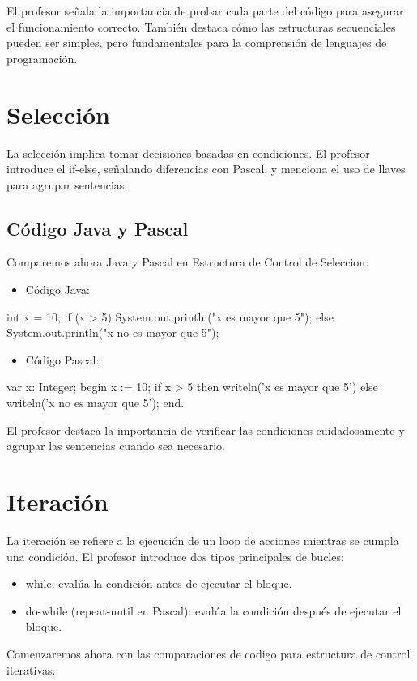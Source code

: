 \documentclass[a4paper]{report}
\begin{document}
El profesor señala la importancia de probar cada parte del código para asegurar el funcionamiento correcto. También destaca cómo las estructuras secuenciales pueden ser simples, pero fundamentales para la comprensión de lenguajes de programación.



\section{Selección}
La selección implica tomar decisiones basadas en condiciones. El profesor introduce el if-else, señalando diferencias con Pascal, y menciona el uso de llaves para agrupar sentencias.

\subsection{Código Java y Pascal}
Comparemos ahora Java y Pascal en Estructura de Control de Seleccion:

\begin{itemize}
    \item Código Java:
\end{itemize}
\begin{roundedlst}
int x = 10;
if (x > 5) {
    System.out.println("x es mayor que 5");
} else {
    System.out.println("x no es mayor que 5");
}
\end{roundedlst}

\begin{itemize}
    \item Código Pascal:
\end{itemize}
\begin{roundedlst}
var
  x: Integer;
begin
  x := 10;
  if x > 5 then
    writeln('x es mayor que 5')
  else
    writeln('x no es mayor que 5');
end.
\end{roundedlst}

El profesor destaca la importancia de verificar las condiciones cuidadosamente y agrupar las sentencias cuando sea necesario.

\section{Iteración}

La iteración se refiere a la ejecución de un loop de acciones mientras se cumpla una condición. 
El profesor introduce dos tipos principales de bucles: 
\begin{itemize}
    \item while: evalúa la condición antes de ejecutar el bloque.
    \item do-while (repeat-until en Pascal): evalúa la condición después de ejecutar el bloque.  
\end{itemize}
Comenzaremos ahora con las comparaciones de codigo para estructura de control iterativas:
\end{document}
